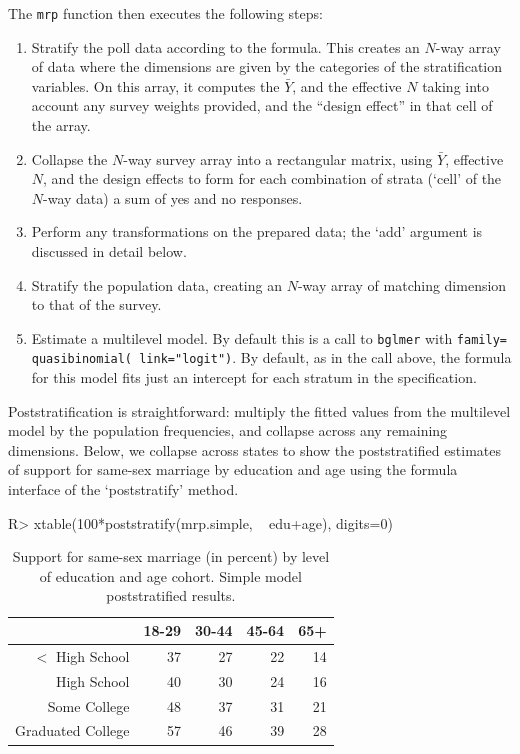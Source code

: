 \documentclass[11pt]{article} %
\begin{document}
The \texttt{mrp} function then executes the following steps:
\begin{enumerate}
\item Stratify the poll data according to the formula. This creates an $N$-way array of data where the dimensions are given by the categories of the stratification variables. On this array, it computes the $\bar{Y}$, and the effective $N$ taking into account any survey weights provided, and the “design effect” in that cell of the array.
\item Collapse the $N$-way survey array into a rectangular matrix, using $\bar{Y}$, effective $N$, and the design effects to form for each combination of strata (`cell' of the $N$-way data) a sum of yes and no responses.
\item Perform any transformations on the prepared data; the `add' argument is discussed in detail below.
\item Stratify the population data, creating an $N$-way array of matching dimension to that of the survey.
\item Estimate a multilevel model. By default this is a call to \texttt{bglmer} with \texttt{family= quasibinomial( link="logit")}. By default, as in the call above, the formula for this model fits just an intercept for each stratum in the specification. 
\end{enumerate}

Poststratification is straightforward: multiply the fitted values from the multilevel model by the population frequencies, and collapse across any remaining dimensions. Below, we collapse across states to show the poststratified estimates of support for same-sex marriage by education and age using the formula interface of the `poststratify' method.

\begin{Schunk}
\begin{Sinput}
R> xtable(100*poststratify(mrp.simple, ~ edu+age), digits=0)
\end{Sinput}
\end{Schunk}
\begin{table}
  \centering
  \caption{Support for same-sex marriage (in percent) by level of education and age cohort. Simple model poststratified results.}
  \label{tab:table-simplemodel}
\begin{tabular}{rrrrr}
  \hline
 & 18-29 & 30-44 & 45-64 & 65+ \\ 
  \hline
$<$ High School & 37 & 27 & 22 & 14 \\ 
  High School & 40 & 30 & 24 & 16 \\ 
  Some College & 48 & 37 & 31 & 21 \\ 
  Graduated College & 57 & 46 & 39 & 28 \\ 
   \hline
\end{tabular}\end{table}
\end{document}
